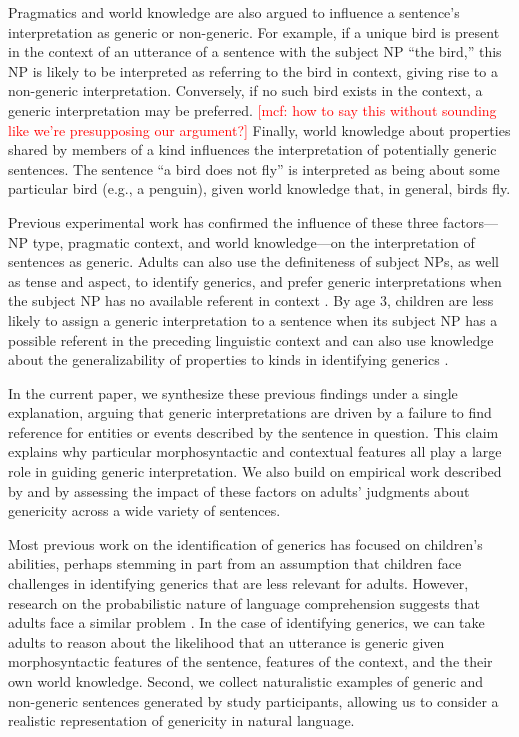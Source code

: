 \documentclass[10pt,letterpaper]{article}
\newcommand{\mcf}[1]{\textcolor{Red}{[mcf: #1]}}
\begin{document}
Pragmatics and world knowledge are also argued to influence a sentence's interpretation as generic or non-generic. For example, if a unique bird is present in the context of an utterance of a sentence with the subject NP ``the bird,'' this NP is likely to be interpreted as referring to the bird in context, giving rise to a non-generic interpretation. Conversely, if no such bird exists in the context, a generic interpretation may be preferred. \mcf{how to say this without sounding like we're presupposing our argument?} Finally, world knowledge about properties shared by members of a kind influences the interpretation of potentially generic sentences. The sentence ``a bird does not fly'' is interpreted as being about some particular bird (e.g., a penguin), given world knowledge that, in general, birds fly.

Previous experimental work has confirmed the influence of these three factors---NP type, pragmatic context, and world knowledge---on the interpretation of sentences as generic. Adults can also use the definiteness of subject NPs, as well as tense and aspect, to identify generics, and prefer generic interpretations when the subject NP has no available referent in context \cite{Gelman:2003,Cimpian:2011}. By age 3, children are less likely to assign a generic interpretation to a sentence when its subject NP has a possible referent in the preceding linguistic context and can also use knowledge about the generalizability of properties to kinds in identifying generics \cite{Cimpian:2008}.

In the current paper, we synthesize these previous findings under a single explanation, arguing that generic interpretations are driven by a failure to find reference for entities or events described by the sentence in question. This claim explains why particular morphosyntactic and contextual features all play a large role in guiding generic interpretation. We also build on empirical work described by  and  by assessing the impact of these factors on adults' judgments about genericity across a wide variety of sentences.

Most previous work on the identification of generics has focused on children's abilities, perhaps stemming in part from an assumption that children face challenges in identifying generics that are less relevant for adults. However, research on the probabilistic nature of language comprehension suggests that adults face a similar problem \cite{Levy:2008,Frank:2012}. In the case of identifying generics, we can take adults to reason about the likelihood that an utterance is generic given morphosyntactic features of the sentence, features of the context, and the their own world knowledge. Second, we collect naturalistic examples of generic and non-generic sentences generated by study participants, allowing us to consider a realistic representation of genericity in natural language.
\end{document}
